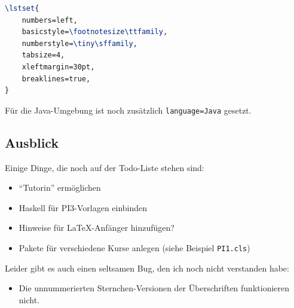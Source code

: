 \documentclass[nicefonts,nogruppe,nosemester,noveranstaltung,notutor,noabgabe,utf]{uhb-inf-tex}
\begin{document}
\begin{lstlisting}[language=tex]
\lstset{
	numbers=left,
	basicstyle=\footnotesize\ttfamily,
	numberstyle=\tiny\sffamily,
	tabsize=4,
	xleftmargin=30pt,
	breaklines=true,
}
\end{lstlisting}

Für die Java-Umgebung ist noch zusätzlich \texttt{language=Java} gesetzt.

\subsection{Ausblick}

Einige Dinge, die noch auf der Todo-Liste stehen sind:

\begin{itemize}
	\item "`Tutorin"' ermöglichen
	\item Haskell für PI3-Vorlagen einbinden
	\item Hinweise für \LaTeX-Anfänger hinzufügen?
	\item Pakete für verschiedene Kurse anlegen (siehe Beispiel \texttt{PI1.cls})
\end{itemize}

Leider gibt es auch einen seltsamen Bug, den ich noch nicht verstanden habe:

\begin{itemize}
	\item Die unnummerierten Sternchen-Versionen der Überschriften funktionieren nicht.
\end{itemize}
\end{document}
